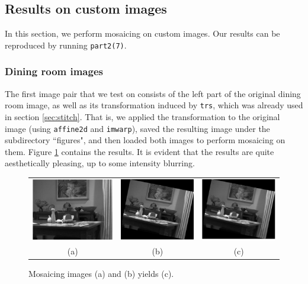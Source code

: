 \documentclass[11pt]{article} %
\begin{document}
\subsection{Results on custom images}

In this section, we perform mosaicing on custom images. Our results can be reproduced by running \texttt{part2(7)}.

\subsubsection{Dining room images}

The first image pair that we test on consists of the left part of the original dining room image, as well as its transformation induced by \texttt{trs}, which was already used in section \ref{sec:stitch}. That is, we applied the transformation to the original image (using \texttt{affine2d} and \texttt{imwarp}), saved the resulting image under the subdirectory ``figures", and then loaded both images to perform mosaicing on them. Figure \ref{fig:mosaicPair1} contains the results. It is evident that the results are quite aesthetically pleasing, up to some intensity blurring.

\begin{figure}[H]
	\centering
	\begin{tabular}{ccc}
		\includegraphics[width=.3\textwidth]{LR1bw} & 
		\includegraphics[width=.3\textwidth]{figures/rotated_figure} & 
		\includegraphics[width=.3\textwidth]{figures/mosaic_rotation} \\
		(a) & (b) & (c)
	\end{tabular}
	\caption{Mosaicing images (a) and (b) yields (c).}
	\label{fig:mosaicPair1}
\end{figure}
\end{document}
